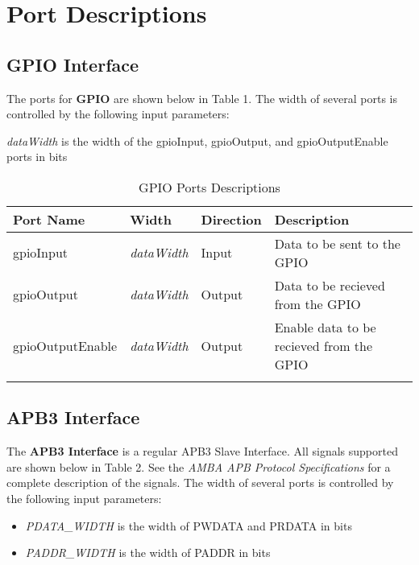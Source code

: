 \section{Port Descriptions}

\subsection{GPIO Interface}

The ports for \textbf{GPIO} are shown below in 
Table 1. The width of several ports is controlled 
by the following input parameters:

\textit{dataWidth} is the width of the gpioInput, gpioOutput, and gpioOutputEnable ports in bits
 
\renewcommand*{\arraystretch}{1.4}
\begin{longtable}[H]{
  | p{}
  | p{}
  | p{}
  | p{} |
  }
  \hline
  \textbf{Port Name} &   
  \textbf{Width} &   
  \textbf{Direction} &   
  \textbf{Description} \\ \hline \hline

  gpioInput &       
  \textit{dataWidth} & 
  Input &       
  Data to be sent to the GPIO\\ \hline

  gpioOutput &        
  \textit{dataWidth} & 
  Output &       
  Data to be recieved from the GPIO \\ \hline

  gpioOutputEnable &      
  \textit{dataWidth} & 
  Output &     
  Enable data to be recieved from the GPIO \\ \hline
 
  \caption{GPIO Ports Descriptions}\label{table:ports}
\end{longtable}

\subsection{APB3 Interface}
The \textbf{APB3 Interface} is a regular APB3 Slave Interface. All signals supported are shown below in 
Table 2. See the \textit{AMBA APB Protocol Specifications} for a complete description of the signals. The width of several ports is controlled 
by the following input parameters:

\begin{itemize}[noitemsep]
  \item \textit{PDATA\_WIDTH} is the width of PWDATA and PRDATA in bits
  \item \textit{PADDR\_WIDTH} is the width of PADDR in bits
\end{itemize}
 
